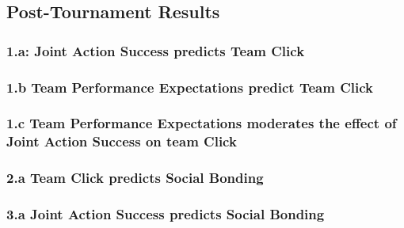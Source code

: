{\subsection{Post-Tournament Results}

\subsubsection{1.a: Joint Action Success predicts Team Click}
\subsubsection{1.b Team Performance Expectations predict Team Click}
\subsubsection{1.c Team Performance Expectations moderates the effect of Joint Action Success on team Click}


\subsubsection{2.a Team Click predicts Social Bonding}
\subsubsection{3.a Joint Action Success predicts Social Bonding}
}
